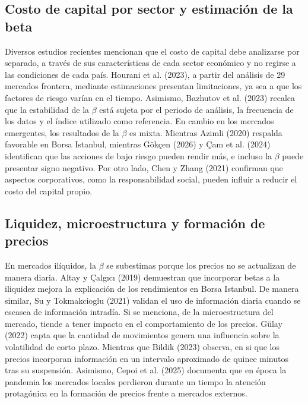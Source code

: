 \documentclass[12pt]{article}
\begin{document}
\subsection{Costo de capital por sector y estimación de la beta}
Diversos estudios recientes mencionan que el costo de capital debe analizarse por separado, a través de sus características de cada sector económico y no regirse a las condiciones de cada país. Hourani et al. (2023), a partir del análisis de 29 mercados frontera, mediante estimaciones presentan limitaciones, ya sea a que los factores de riesgo varían en el tiempo. Asimismo, Bazhutov et al. (2023) recalca que la estabilidad de la $\beta$ está sujeta por el periodo de análisis, la frecuencia de los datos y el índice utilizado como referencia. En cambio en los mercados emergentes, los resultados de la $\beta$ es mixta. Mientras Azimli (2020) respalda favorable en Borsa Istanbul, mientras Gökçen (2026) y Çam et al. (2024) identifican que las acciones de bajo riesgo pueden rendir más, e incluso la $\beta$  puede presentar signo negativo. Por otro lado, Chen y Zhang (2021) confirman que aspectos corporativos, como la responsabilidad social, pueden influir a reducir el costo del capital propio.

\subsection{Liquidez, microestructura y formación de precios}
En mercados ilíquidos, la $\beta$ se subestimas porque los precios no se actualizan de manera diaria. Altay y Çalgıcı (2019) demuestran que incorporar betas a la iliquidez mejora la explicación de los rendimientos en Borsa Istanbul. De manera similar, Su y Tokmakcioglu (2021) validan el uso de información diaria cuando se escasea de información intradía. Si se menciona, de la microestructura del mercado, tiende a tener impacto en el comportamiento de los precios. Gülay (2022) capta que la cantidad de movimientos genera una influencia sobre la volatilidad de corto plazo. Mientras que Bildik (2023) observa, en si que los precios incorporan información en un intervalo aproximado de quince minutos tras su suspensión. Asimismo, Cepoi et al. (2025) documenta que en época la pandemia los mercados locales perdieron durante un tiempo la atención protagónica en la formación de precios frente a mercados externos.
\end{document}
